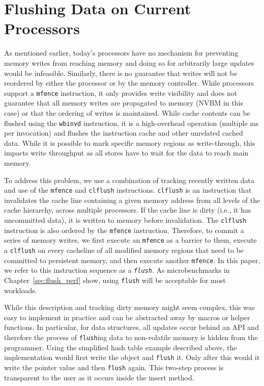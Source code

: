 \section{Flushing Data on Current Processors}
\label{sec:flush}

As mentioned earlier, today's processors have no mechanism for
preventing memory writes from reaching memory and doing so for
arbitrarily large updates would be infeasible.  Similarly, there is no
guarantee that writes will not be reordered by either the processor or
by the memory controller.  While processors support a \texttt{mfence}
instruction, it only provides write visibility and does not guarantee
that all memory writes are propagated to memory (NVBM in this case) or
that the ordering of writes is maintained.  While cache contents can
be flushed using the \texttt{wbinvd} instruction, it is a
high-overhead operation (multiple ms per invocation) and flushes the
instruction cache and other unrelated cached data.  While it is
possible to mark specific memory regions as write-through, this impacts
write throughput as all stores have to wait for the data to reach main
memory.


To address this problem, we use a combination of tracking recently
written data and use of the \texttt{mfence} and \texttt{clflush}
instructions.  \texttt{clflush} is an instruction that invalidates the
cache line containing a given memory address from all levels of the
cache hierarchy, across multiple processors.  If the cache line is dirty
(i.e., it has uncommitted data), it is written to memory before
invalidation. The \texttt{clflush} instruction is also ordered by the
\texttt{mfence} instruction.
Therefore, to commit a series of memory writes, we first execute an
\texttt{mfence} as a barrier to them, execute a \texttt{clflush} on
every cacheline of all modified memory regions that need to be
committed to persistent memory, and then execute another
\texttt{mfence}.  In this paper, we refer to this instruction
sequence as a \textit{\texttt{flush}}.  As microbenchmarks in
Chapter~\ref{sec:flush_perf} show, using \texttt{flush} will be
acceptable for most workloads.

While this description and tracking dirty memory might seem complex,
this was easy to implement in practice and can be abstracted away by
macros or helper functions.  In particular, for data structures, all
updates occur behind an API and therefore the process of
\texttt{flush}ing data to non-volatile memory is hidden from the
programmer. Using the simplified hash table example described above,
the implementation would first write the object and \texttt{flush}
it. Only after this would it write the pointer value and then
\texttt{flush} again.  This two-step process is transparent to the
user as it occurs inside the insert method.

